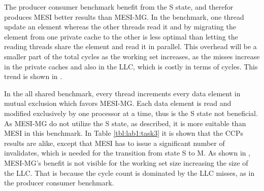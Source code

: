 The producer consumer benchmark benefit from the S state, and therefor produces MESI better results than MESI-MG. In the benchmark, one thread update an element whereas the other threads read it and by migrating the element from one private cache to the other is less optimal than letting the reading threads share the element and read it in parallel. This overhead will be a smaller part of the total cycles as the working set increases, as the misses increase in the private caches and also in the LLC, which is costly in terms of cycles. This trend is shown in . 

In the all shared benchmark, every thread increments every data element in mutual exclusion which favors MESI-MG. Each data element is read and modified exclusively by one processor at a time, thus is the S state not beneficial. As MESI-MG do not utilize the S state, as described, it is more suitable than MESI in this benchmark. In Table \ref{tbl:lab1:task3} it is shown that the CCPs results are alike, except that MESI has to issue a significant number of invalidates, which is needed for the transition from state S to M. As shown in , MESI-MG's benefit is not visible for the working set size increasing the size of the LLC. That is because the cycle count is dominated by the LLC misses, as in the producer consumer benchmark.